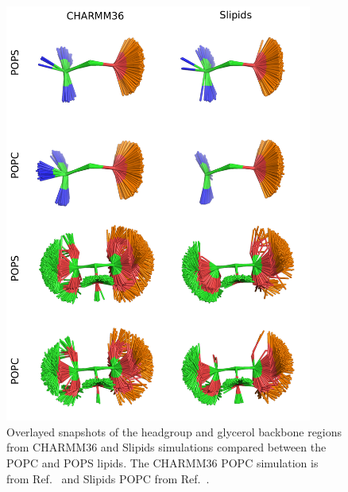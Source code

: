 \documentclass[journal=jpcbfk,manuscript=article]{achemso}
\begin{document}
\begin{figure}[]
  \centering
  \includegraphics[width=0.9\textwidth]{../Figs/figS8_POPC.png}
  \caption{\label{HGandGLYstructuresPSPC}
    Overlayed snapshots of the headgroup and glycerol backbone regions 
    from CHARMM36 and Slipids simulations compared between the POPC and POPS lipids.
    The CHARMM36 POPC simulation is from Ref.~ and Slipids POPC from Ref.~.
  }
\end{figure}




\pagebreak
\end{document}
